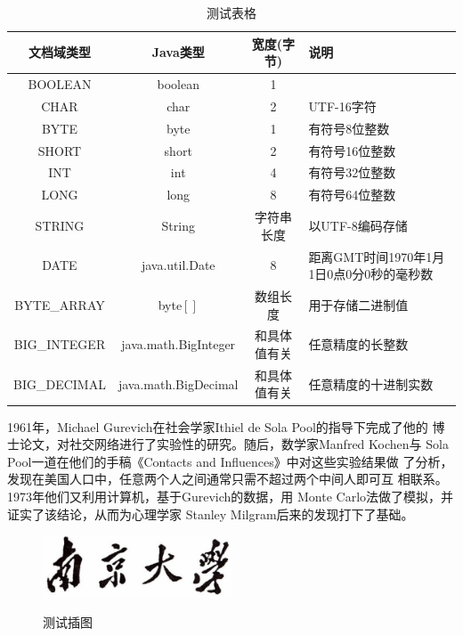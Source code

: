\documentclass[oneside, phd]{njuthesis}
\begin{document}
\begin{table}
  \centering
  \begin{tabular}{cccp{38mm}}
    \toprule
    \textbf{文档域类型} & \textbf{Java类型} & \textbf{宽度(字节)} & \textbf{说明} \\
    \midrule
    BOOLEAN  & boolean &  1  & \\
    CHAR     & char    &  2  & UTF-16字符 \\
    BYTE     & byte    &  1  & 有符号8位整数 \\
    SHORT    & short   &  2  & 有符号16位整数 \\
    INT      & int     &  4  & 有符号32位整数 \\
    LONG     & long    &  8  & 有符号64位整数 \\
    STRING   & String  &  字符串长度  & 以UTF-8编码存储 \\
    DATE     & java.util.Date & 8 & 距离GMT时间1970年1月1日0点0分0秒的毫秒数 \\
    BYTE\_ARRAY & byte$[]$ & 数组长度 & 用于存储二进制值 \\
    BIG\_INTEGER & java.math.BigInteger & 和具体值有关 & 任意精度的长整数 \\
    BIG\_DECIMAL & java.math.BigDecimal & 和具体值有关 & 任意精度的十进制实数 \\
    \bottomrule
  \end{tabular}
  \caption{测试表格}\label{table:test2}
\end{table}

1961年，Michael Gurevich在社会学家Ithiel de Sola Pool的指导下完成了他的
博士论文，对社交网络进行了实验性的研究。随后，数学家Manfred Kochen与
Sola Pool一道在他们的手稿《Contacts and Influences》中对这些实验结果做
了分析，发现在美国人口中，任意两个人之间通常只需不超过两个中间人即可互
相联系\cite{pool1978}。1973年他们又利用计算机，基于Gurevich的数据，用
Monte Carlo法做了模拟，并证实了该结论\cite{pool1978}，从而为心理学家
Stanley Milgram后来的发现打下了基础。

\begin{figure}[htbp]
  \centering
  \includegraphics[width= 0.5\textwidth]{njuname.eps}\\
  \caption{测试插图}\label{fig:test3}
\end{figure}
\end{document}
